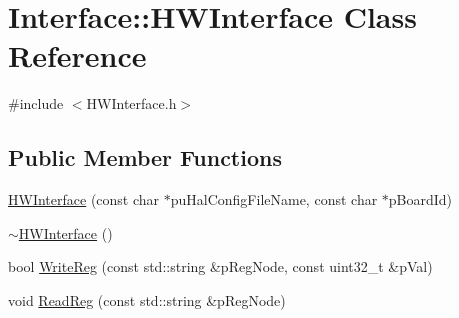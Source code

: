 \hypertarget{class_interface_1_1_h_w_interface}{\section{Interface\-:\-:H\-W\-Interface Class Reference}
\label{class_interface_1_1_h_w_interface}
}


{\ttfamily \#include $<$H\-W\-Interface.\-h$>$}

\subsection*{Public Member Functions}
\begin{DoxyCompactItemize}
\item 
\hyperlink{class_interface_1_1_h_w_interface_a62c2107fa9f530148b5cfc6344819f05_a62c2107fa9f530148b5cfc6344819f05}{H\-W\-Interface} (const char $\ast$pu\-Hal\-Config\-File\-Name, const char $\ast$p\-Board\-Id)
\item 
\hyperlink{class_interface_1_1_h_w_interface_af393e1cf0cd09226f4b0bdc48db9a4ab_af393e1cf0cd09226f4b0bdc48db9a4ab}{$\sim$\-H\-W\-Interface} ()
\item 
bool \hyperlink{class_interface_1_1_h_w_interface_a16f82bd40bb7d6616eedf524b1f76631_a16f82bd40bb7d6616eedf524b1f76631}{Write\-Reg} (const std\-::string \&p\-Reg\-Node, const uint32\-\_\-t \&p\-Val)
\item 
void \hyperlink{class_interface_1_1_h_w_interface_a5083f39fada564d34bbc53a2c7a5032c_a5083f39fada564d34bbc53a2c7a5032c}{Read\-Reg} (const std\-::string \&p\-Reg\-Node)
\end{DoxyCompactItemize}


